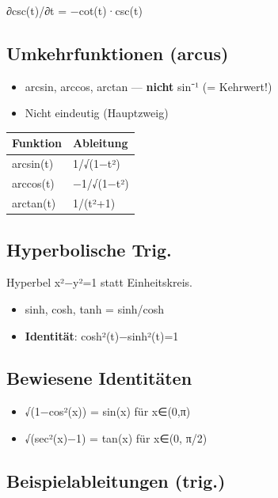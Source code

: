 \documentclass[11pt, a4paper]{article}
\begin{document}
∂csc(t)/∂t = −cot(t)·csc(t)



\subsection{Umkehrfunktionen (arcus)}
\begin{itemize}
  \item arcsin, arccos, arctan — \textbf{nicht} sin⁻¹ (= Kehrwert!)
  \item Nicht eindeutig (Hauptzweig)
\end{itemize}


{\small
\begin{tabularx}{\linewidth}{XX}
\hline
\rowcolor{tableheadbg}
{\color{white}\textbf{Funktion}} & {\color{white}\textbf{Ableitung}} \\[2pt]
\hline
\endhead
\hline
\endfoot
arcsin(t) & 1/√(1−t²) \\
arccos(t) & −1/√(1−t²) \\
arctan(t) & 1/(t²+1) \\
\end{tabularx}
}



\subsection{Hyperbolische Trig.}
Hyperbel x²−y²=1 statt Einheitskreis.

\begin{itemize}
  \item sinh, cosh, tanh = sinh/cosh
  \item \textbf{Identität}: cosh²(t)−sinh²(t)=1
\end{itemize}


\subsection{Bewiesene Identitäten}
\begin{itemize}
  \item √(1−cos²(x)) = sin(x) für x∈(0,π)
  \item √(sec²(x)−1) = tan(x) für x∈(0, π/2)
\end{itemize}


\subsection{Beispielableitungen (trig.)}
\end{document}
